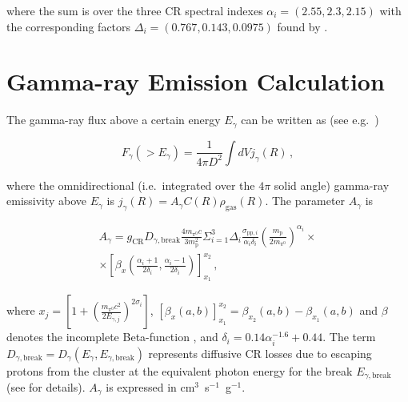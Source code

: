 \documentclass[traditabstract]{aa}
\newcommand{\rmn}{\mathrm}
\begin{document}
\begin{appendix}
where the sum is over the three CR spectral indexes $\alpha_{i}=(2.55,2.3,2.15)$ with the corresponding factors $\Delta_{i} = (0.767, 0.143, 0.0975)$ found by \cite{2010MNRAS.409..449P}. 
 


\section{Gamma-ray Emission Calculation}
\label{app:C}

The gamma-ray flux above a certain energy $E_{\gamma}$ can be written as (see e.g.~\citealp{2010MNRAS.409..449P})

\begin{equation}
F_{\gamma} (>E_{\gamma}) = \frac{1}{4\pi D^{2}} \int dV  j_{\gamma}(R)\, ,
\end{equation}

where the omnidirectional (i.e.~integrated over the $4\pi$ solid angle) gamma-ray emissivity above $E_{\gamma}$ is $ j_{\gamma}(R)=A_{\gamma} C(R) \rho_{\rmn{gas}}(R)$. The parameter $A_{\gamma}$ is \citep{2010MNRAS.409..449P}

\begin{eqnarray}
A_{\gamma} = g_{\rmn{CR}} D_{\gamma,\rmn{break}} \frac{4 m_{\pi^{0}} c}{3 m_{\rmn{p}}^{2}} \Sigma_{i=1}^{3} \Delta_{i} \frac{\sigma_{\rmn{pp},i}}{\alpha_{i} \delta_{i}} \left( \frac{m_{\rmn{p}}}{2 m_{\pi^{0}}} \right)^{\alpha_{i}} \times \nonumber \\
\times \left[ \beta_{x} \left( \frac{\alpha_{i}+1}{2\delta_{i}}, \frac{\alpha_{i}-1}{2\delta_{i}} \right) \right]_{x_{1}}^{x_{2}} \, ,
\end{eqnarray}

where $x_{j}=\left[ 1 + \left( \frac{m_{\pi^{0}}c^2}{2E_{\gamma,j}} \right)^{2\sigma_{i}} \right]$, $\left[ \beta_{x}(a,b) \right]_{x_1}^{x_2} = \beta_{x_2}(a,b)-\beta_{x_1}(a,b)$ and $\beta$ denotes the incomplete Beta-function \citep{1965hmfw.book.....A}, and $\delta_{i}=0.14\alpha_{i}^{-1.6}+0.44$. The term $D_{\gamma, \rmn{break}}=D_{\gamma}(E_{\gamma},E_{\gamma,\rmn{break}})$ represents diffusive CR losses due to escaping protons from the cluster at the equivalent photon energy for the break $E_{\gamma, \rmn{break}}$ (see \citealp{2010MNRAS.409..449P} for details). $A_{\gamma}$ is expressed in cm$^3$~s$^{-1}$~g$^{-1}$. 




\end{appendix}
\end{document}
